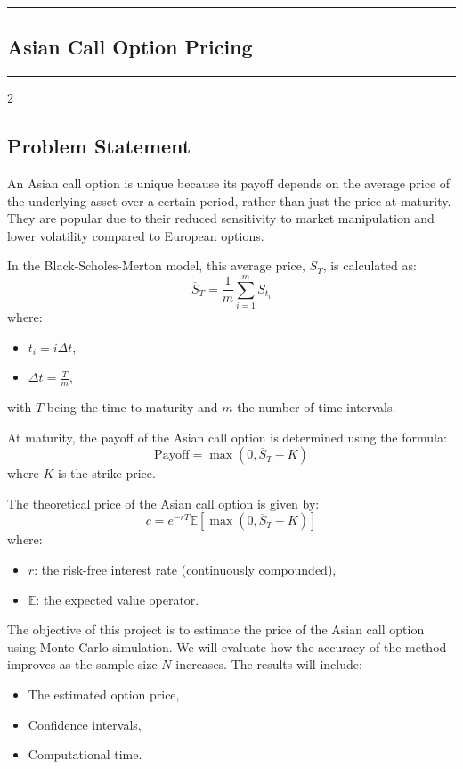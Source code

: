{\color{gray}\hrule}
\begin{center}
\section{Asian Call Option Pricing}
\bigskip
\end{center}
{\color{gray}\hrule}
\begin{multicols}{2}

\subsection{Problem Statement}
An Asian call option is unique because its payoff depends on the average price of the underlying asset over a certain period, rather than just the price at maturity. \cite{PAOMCC} They are popular due to their reduced sensitivity to market manipulation and lower volatility compared to European options.

In the Black-Scholes-Merton model, this average price, \(\overline{S}_T\), is calculated as:
\[
\overline{S}_T = \frac{1}{m} \sum_{i=1}^{m} S_{t_i}\]
where:
\begin{itemize}
    \item \(t_i = i \Delta t\), 
    \item \(\Delta t = \frac{T}{m}\), 
\end{itemize}
with \(T\) being the time to maturity and \(m\) the number of time intervals.

At maturity, the payoff of the Asian call option is determined using the formula:
\[
\text{Payoff} = \max(0, \overline{S}_T - K)
\]
where \(K\) is the strike price. 

The theoretical price of the Asian call option\cite{PAOMCC} is given by:
\[
c = e^{-rT } \mathbb{E}[\max(0, \overline{S}_T - K)]
\]
where:
\begin{itemize}
    \item \(r\): the risk-free interest rate (continuously compounded),
    \item \(\mathbb{E}\): the expected value operator.
\end{itemize}

The objective of this project is to estimate the price of the Asian call option\cite{PAOBOMCC} using Monte Carlo simulation. We will evaluate how the accuracy of the method improves as the sample size \(N\) increases. The results will include:
\begin{itemize}
    \item The estimated option price,
    \item Confidence intervals,
    \item Computational time.
\end{itemize}


\end{multicols}
